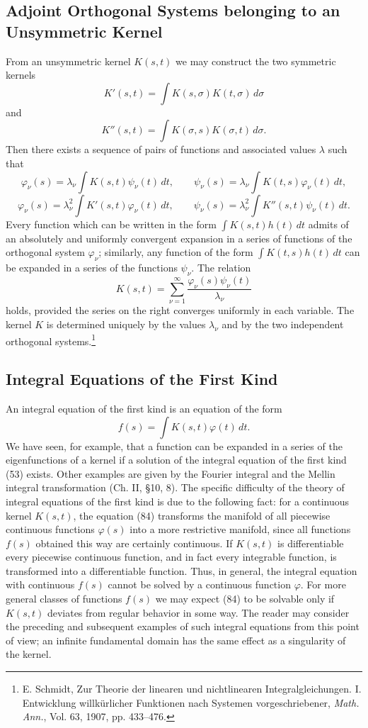 \subsection{Adjoint Orthogonal Systems belonging to an Unsymmetric Kernel}
From an unsymmetric kernel $K(s,t)$ we may construct the two symmetric kernels
\[
K'(s,t)=\int K(s,\sigma)K(t,\sigma)\,d\sigma
\]
and
\[
K''(s,t)=\int K(\sigma,s)K(\sigma,t)\,d\sigma.
\]
Then there exists a sequence of pairs of functions and associated values $\lambda$ such that
\[
\varphi_\nu(s)=\lambda_\nu\int K(s,t)\psi_\nu(t)\,dt,
\qquad
\psi_\nu(s)=\lambda_\nu\int K(t,s)\varphi_\nu(t)\,dt,
\]
\[
\varphi_\nu(s)=\lambda_\nu^2\int K'(s,t)\varphi_\nu(t)\,dt,
\qquad
\psi_\nu(s)=\lambda_\nu^2\int K''(s,t)\psi_\nu(t)\,dt.
\]
Every function which can be written in the form $\int K(s,t)h(t)\,dt$ admits of an absolutely and uniformly convergent expansion in a series of functions of the orthogonal system $\varphi_\nu$; similarly, any function of the form $\int K(t,s)h(t)\,dt$ can be expanded in a series of the functions $\psi_\nu$. The relation
\[
K(s,t)=\sum_{\nu=1}^{\infty}\frac{\varphi_\nu(s)\psi_\nu(t)}{\lambda_\nu}
\]
holds, provided the series on the right converges uniformly in each variable. The kernel $K$ is determined uniquely by the values $\lambda_\nu$ and by the two independent orthogonal systems.\footnote{E. Schmidt, Zur Theorie der linearen und nichtlinearen Integralgleichungen. I. Entwicklung willk\"urlicher Funktionen nach Systemen vorgeschriebener, \emph{Math. Ann.}, Vol. 63, 1907, pp. 433--476.}

\subsection{Integral Equations of the First Kind}
An integral equation of the first kind is an equation of the form
\begin{equation}\tag{84}
f(s)=\int K(s,t)\varphi(t)\,dt.
\end{equation}
We have seen, for example, that a function can be expanded in a series of the eigenfunctions of a kernel if a solution of the integral equation of the first kind (53) exists. Other examples are given by the Fourier integral and the Mellin integral transformation (Ch. II, \S10, 8). The specific difficulty of the theory of integral equations of the first kind is due to the following fact: for a continuous kernel $K(s,t)$, the equation (84) transforms the manifold of all piecewise continuous functions $\varphi(s)$ into a more restrictive manifold, since all functions $f(s)$ obtained this way are certainly continuous. If $K(s,t)$ is differentiable every piecewise continuous function, and in fact every integrable function, is transformed into a differentiable function. Thus, in general, the integral equation with continuous $f(s)$ cannot be solved by a continuous function $\varphi$. For more general classes of functions $f(s)$ we may expect (84) to be solvable only if $K(s,t)$ deviates from regular behavior in some way. The reader may consider the preceding and subsequent examples of such integral equations from this point of view; an infinite fundamental domain has the same effect as a singularity of the kernel.

